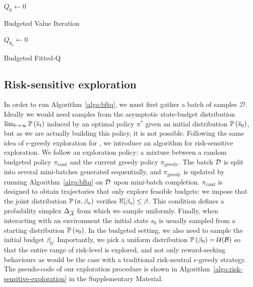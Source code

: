\documentclass{article}
\begin{document}
\begin{minipage}[t]{0.47\textwidth}
\vspace{0pt}  
\begin{algorithm}[H]
\label{algo:bvi}
\DontPrintSemicolon
{}
$Q_{0} \leftarrow 0$\;
\caption{Budgeted Value Iteration}
\end{algorithm}
\end{minipage}%
\hfill
\begin{minipage}[t]{0.47\textwidth}
\vspace{0pt}
\begin{algorithm}[H]
\label{algo:bftq}
\DontPrintSemicolon
\KwData{$\cD$}
$Q_{\theta_0} \leftarrow 0$\;
\caption{Budgeted Fitted-Q}
\end{algorithm}
\end{minipage}

\subsection{Risk-sensitive exploration}

\label{sec:exploration}

In order to run Algorithm~\ref{algo:bftq}, we must first gather a batch of samples $\mathcal{D}$. Ideally we would need samples from the asymptotic state-budget distribution $\lim_{t\rightarrow\infty}\mathbb{P}\left(\overline{s}_t\right)$ induced by an optimal policy $\pi^*$ given an initial distribution $\mathbb{P}\left(\overline{s}_0\right)$, but as we are actually building this policy, it is not possible. Following the same idea of $\epsilon$-greedy exploration for \FTQ \citep{Ernst2005,Riedmiller2005}, we introduce an algorithm for risk-sensitive exploration. We follow an exploration policy: a mixture between a random budgeted policy $\pi_\text{rand}$ and the current greedy policy $\pi_\text{greedy}$. The batch $\cD$ is split into several mini-batches generated sequentially, and $\pi_\text{greedy}$ is updated by running Algorithm~\ref{algo:bftq} on $\cD$ upon mini-batch completion. $\pi_\text{rand}$ is designed to obtain trajectories that only explore feasible budgets: we impose that the joint distribution $\mathbb{P}\left(a, \beta_a\right)$ verifies $\operatorname*{\mathbb{E}}[\beta_a]\leq\beta$. This condition defines a probability simplex $\Delta_{\overline{\mathcal{A}}}$ from which we sample uniformly. Finally, when interacting with an environment the initial state $s_0$ is usually sampled from a starting distribution $\mathbb{P}\left(s_0\right)$. In the budgeted setting, we also need to sample the initial budget $\beta_0$. Importantly, we pick a uniform distribution $\mathbb{P}\left(\beta_0\right) = \mathcal{U}(\mathcal{B})$ so that the entire range of risk-level is explored, and not only reward-seeking behaviours as would be the case with a traditional risk-neutral $\epsilon$-greedy strategy. The pseudo-code of our exploration procedure is shown in Algorithm~\ref{algo:risk-sensitive-exploration} in the Supplementary Material.
\end{document}
